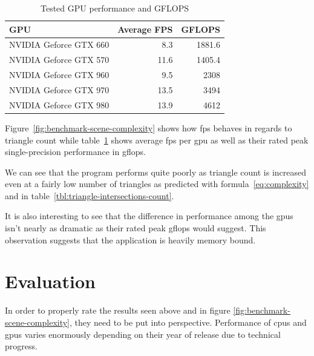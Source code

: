 \documentclass[
  twoside,
  11pt, a4paper,
  footinclude=true,
  headinclude=true,
  cleardoublepage=empty
]{scrreprt}
\begin{document}
\begin{minipage}{\textwidth}
    \begin{table}[H]
        \centering
        \begin{tabular}{l | r | r}
            GPU                     & Average FPS   & GFLOPS \\ \hline
            NVIDIA Geforce GTX 660  & 8.3           & 1881.6 \\
            NVIDIA Geforce GTX 570  & 11.6          & 1405.4 \\
            NVIDIA Geforce GTX 960  & 9.5           & 2308   \\
            NVIDIA Geforce GTX 970  & 13.5          & 3494   \\
            NVIDIA Geforce GTX 980  & 13.9          & 4612
        \end{tabular}
        \caption{Tested GPU performance and GFLOPS}
        \label{tbl:benchmark-table}
    \end{table}
\end{minipage}

Figure~\ref{fig:benchmark-scene-complexity} shows how \ac{fps} behaves in regards to triangle
count while table~\ref{tbl:benchmark-table} shows average \ac{fps} per \ac{gpu} as well as their
rated peak single-precision performance in \ac{gflops}.

We can see that the program performs quite poorly as triangle count is increased even at a
fairly low number of triangles as predicted with formula~\ref{eq:complexity} and in
table~\ref{tbl:triangle-intersections-count}.

It is also interesting to see that the difference in performance among the \acp{gpu} isn't nearly
as dramatic as their rated peak \ac{gflops} would suggest. This observation suggests that the
application is heavily memory bound.

\section{Evaluation}
In order to properly rate the results seen above and in figure \ref{fig:benchmark-scene-complexity},
they need to be put into perspective. Performance
of \acp{cpu} and \acp{gpu} varies enormously depending on their year of release due to technical
progress.
\end{document}
